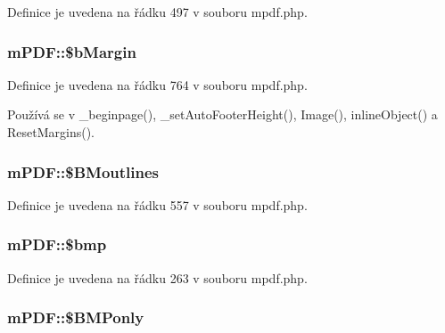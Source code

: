 Definice je uvedena na řádku 497 v souboru mpdf.\-php.

\hypertarget{classm_p_d_f_a4f9a5adc58516fb01a47ff60fe585a7a}{
\subsubsection[{\$b\-Margin}]{\setlength{\rightskip}{0pt plus 5cm}m\-P\-D\-F\-::\$b\-Margin}}\label{classm_p_d_f_a4f9a5adc58516fb01a47ff60fe585a7a}


Definice je uvedena na řádku 764 v souboru mpdf.\-php.



Používá se v \-\_\-beginpage(), \-\_\-set\-Auto\-Footer\-Height(), Image(), inline\-Object() a Reset\-Margins().

\hypertarget{classm_p_d_f_aa03b61b6fc491112d617ac894f4bd0aa}{
\subsubsection[{\$\-B\-Moutlines}]{\setlength{\rightskip}{0pt plus 5cm}m\-P\-D\-F\-::\$\-B\-Moutlines}}\label{classm_p_d_f_aa03b61b6fc491112d617ac894f4bd0aa}


Definice je uvedena na řádku 557 v souboru mpdf.\-php.

\hypertarget{classm_p_d_f_aacb7ce25a9d09e7bf52c9fde4be20a49}{
\subsubsection[{\$bmp}]{\setlength{\rightskip}{0pt plus 5cm}m\-P\-D\-F\-::\$bmp}}\label{classm_p_d_f_aacb7ce25a9d09e7bf52c9fde4be20a49}


Definice je uvedena na řádku 263 v souboru mpdf.\-php.

\hypertarget{classm_p_d_f_a2972b6074ba71c7c9f13e472378bfeb2}{
\subsubsection[{\$\-B\-M\-Ponly}]{\setlength{\rightskip}{0pt plus 5cm}m\-P\-D\-F\-::\$\-B\-M\-Ponly}}\label{classm_p_d_f_a2972b6074ba71c7c9f13e472378bfeb2}


